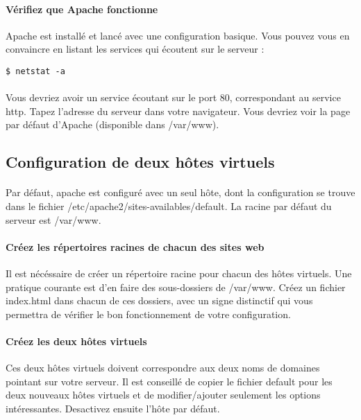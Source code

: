 \documentclass[12pt,a4paper]{article}
\begin{document}
\begin{itemize}
\paragraph{Vérifiez que Apache fonctionne\\}
Apache est installé et lancé avec une configuration basique. Vous pouvez vous en convaincre en listant les services qui écoutent sur le serveur : 

\begin{lstlisting}
$ netstat -a
\end{lstlisting}

\paragraph{}
Vous devriez avoir un service écoutant sur le port 80, correspondant au service http. Tapez l'adresse du serveur dans votre navigateur. Vous devriez voir la page par défaut d'Apache (disponible dans /var/www).

\subsection{Configuration de deux hôtes virtuels}
\paragraph{}
Par défaut, apache est configuré avec un seul hôte, dont la configuration se trouve dans le fichier /etc/apache2/sites-availables/default. La racine par défaut du serveur est /var/www.

\paragraph{Créez les répertoires racines de chacun des sites web\\}
Il est nécéssaire de créer un répertoire racine pour chacun des hôtes virtuels. Une pratique courante est d'en faire des sous-dossiers de /var/www. Créez un fichier index.html dans chacun de ces dossiers, avec un signe distinctif qui vous permettra de vérifier le bon fonctionnement de votre configuration.

\paragraph{Créez les deux hôtes virtuels\\}
Ces deux hôtes virtuels doivent correspondre aux deux noms de domaines pointant sur votre serveur. Il est conseillé de copier le fichier default pour les deux nouveaux hôtes virtuels et de modifier/ajouter seulement les options intéressantes. Desactivez ensuite l'hôte par défaut.


\end{itemize}
\end{document}
